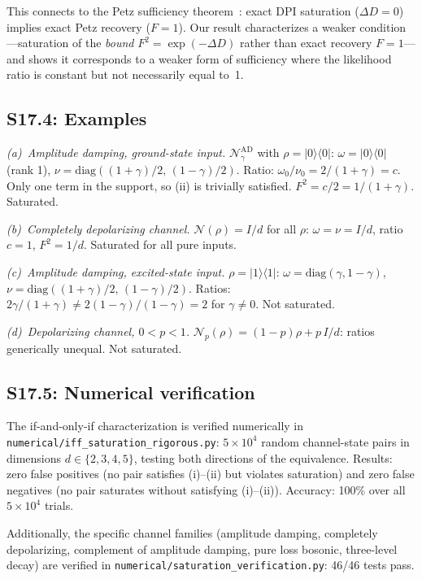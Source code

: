 \documentclass[prl,twocolumn,superscriptaddress,longbibliography]{revtex4-2}
\newcommand{\chan}{\mathcal{N}}
\newcommand{\ket}[1]{|#1\rangle}
\newcommand{\bra}[1]{\langle#1|}
\begin{document}
This connects to the Petz sufficiency theorem~\cite{Petz1988}:
exact DPI saturation ($\Delta D = 0$) implies exact Petz
recovery ($F = 1$).  Our result characterizes a weaker
condition---saturation of the \emph{bound} $F^2 = \exp(-\Delta D)$
rather than exact recovery $F = 1$---and shows it corresponds to
a weaker form of sufficiency where the likelihood ratio is
constant but not necessarily equal to~1.

\subsection{S17.4: Examples}

\emph{(a)~Amplitude damping, ground-state input.}
$\chan_\gamma^{\mathrm{AD}}$ with $\rho = \ket{0}\!\bra{0}$:
$\omega = \ket{0}\!\bra{0}$ (rank 1),
$\nu = \mathrm{diag}((1+\gamma)/2,\,(1-\gamma)/2)$.
Ratio: $\omega_0/\nu_0 = 2/(1+\gamma) = c$.
Only one term in the support, so (ii) is trivially satisfied.
$F^2 = c/2 = 1/(1+\gamma)$. Saturated.

\emph{(b)~Completely depolarizing channel.}
$\chan(\rho) = I/d$ for all $\rho$:
$\omega = \nu = I/d$, ratio $c = 1$, $F^2 = 1/d$.
Saturated for all pure inputs.

\emph{(c)~Amplitude damping, excited-state input.}
$\rho = \ket{1}\!\bra{1}$:
$\omega = \mathrm{diag}(\gamma, 1-\gamma)$,
$\nu = \mathrm{diag}((1+\gamma)/2,\,(1-\gamma)/2)$.
Ratios: $2\gamma/(1+\gamma) \neq 2(1-\gamma)/(1-\gamma) = 2$
for $\gamma \neq 0$. Not saturated.

\emph{(d)~Depolarizing channel, $0 < p < 1$.}
$\chan_p(\rho) = (1-p)\rho + p\,I/d$:
ratios generically unequal. Not saturated.

\subsection{S17.5: Numerical verification}

The if-and-only-if characterization is verified numerically in
\texttt{numerical/iff\_saturation\_rigorous.py}:
$5 \times 10^4$ random channel-state pairs in dimensions
$d \in \{2,3,4,5\}$, testing both directions of the
equivalence.  Results: zero false positives (no pair satisfies
(i)--(ii) but violates saturation) and zero false negatives
(no pair saturates without satisfying (i)--(ii)).
Accuracy: 100\% over all $5\times 10^4$ trials.

Additionally, the specific channel families (amplitude damping,
completely depolarizing, complement of amplitude damping,
pure loss bosonic, three-level decay) are verified in
\texttt{numerical/saturation\_verification.py}: 46/46 tests pass.
\end{document}
